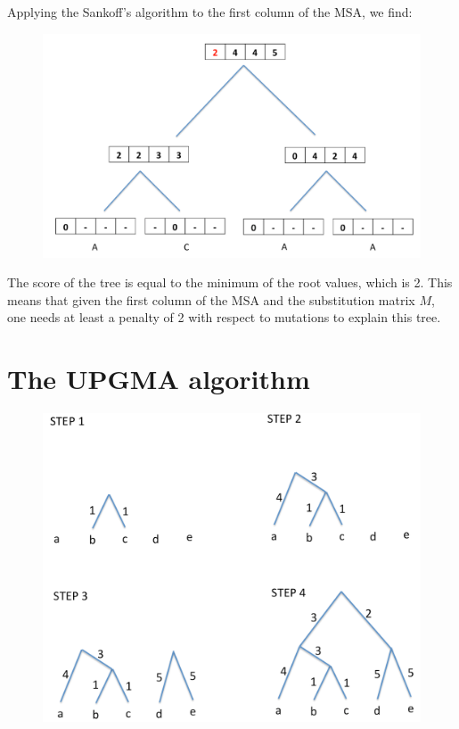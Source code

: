 \documentclass[a4paper,11pt]{article}
\begin{document}
\noindent Applying the Sankoff's algorithm to the first column of the MSA, we find:
\begin{figure}[h!]
\centering\includegraphics[width=12cm]{Fig3.png}
\end{figure}

\noindent The score of the tree is equal to the minimum of the root values, which is 2. This means that given the first column of the MSA and the substitution matrix $M$, one needs at least a penalty of 2 with respect to mutations to explain this tree.

\section{The UPGMA algorithm}

\begin{figure}[h!]
\centering\includegraphics[width=13cm]{Fig4.png}
\end{figure}
\end{document}
